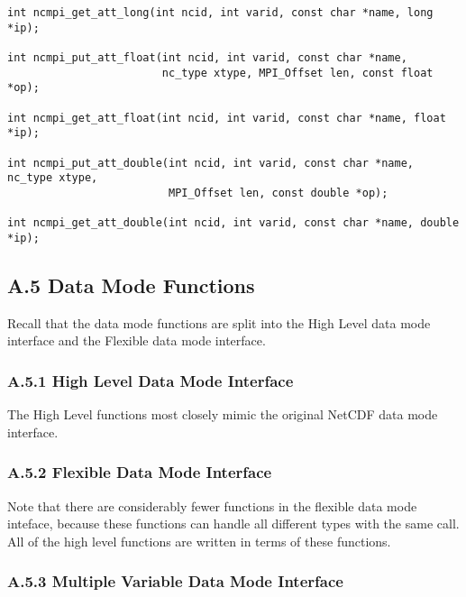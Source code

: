 \begin{verbatim}
int ncmpi_get_att_long(int ncid, int varid, const char *name, long *ip);

int ncmpi_put_att_float(int ncid, int varid, const char *name,
                        nc_type xtype, MPI_Offset len, const float *op);

int ncmpi_get_att_float(int ncid, int varid, const char *name, float *ip);

int ncmpi_put_att_double(int ncid, int varid, const char *name, nc_type xtype,
                         MPI_Offset len, const double *op);

int ncmpi_get_att_double(int ncid, int varid, const char *name, double *ip);
\end{verbatim}

%
%
\subsection*{A.5  Data Mode Functions}

Recall that the data mode functions are split into the High Level data mode interface and the
Flexible data mode interface.

\subsubsection*{A.5.1  High Level Data Mode Interface}

The High Level functions most closely mimic the original NetCDF data mode interface.




\subsubsection*{A.5.2  Flexible Data Mode Interface}

Note that there are considerably fewer functions in the flexible data mode
inteface, because these functions can handle all different types with the same
call.  All of the high level functions are written in terms of these
functions.



\subsubsection*{A.5.3  Multiple Variable Data Mode Interface}

